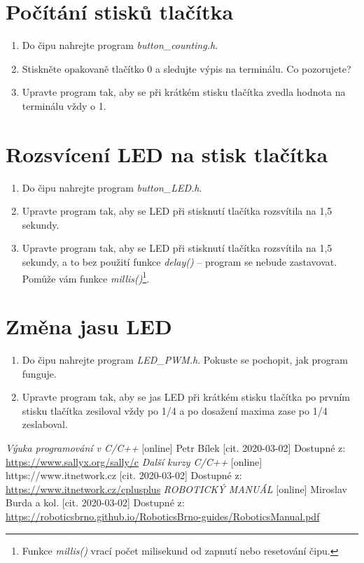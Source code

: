 \documentclass[12pt]{article}
\begin{document}
\section{Počítání stisků tlačítka} 

\begin{enumerate} 
	\item Do čipu nahrejte program \textit{button\_counting.h}. 
	\item Stiskněte opakovaně tlačítko 0 a sledujte výpis na terminálu. Co pozorujete? 
	\item Upravte program tak, aby se při krátkém stisku tlačítka zvedla hodnota na terminálu vždy o 1.
\end{enumerate} 

\section{Rozsvícení LED na stisk tlačítka} \label{button_LED}

\begin{enumerate}
	\item Do čipu nahrejte program \textit{button\_LED.h}.
	\item Upravte program tak, aby se LED při stisknutí tlačítka rozsvítila na 1,5 sekundy. \label{button_LED2}
	\item Upravte program tak, aby se LED při stisknutí tlačítka rozsvítila na 1,5 sekundy, a to bez použití funkce \textit{delay()} -- program se nebude zastavovat. Pomůže vám funkce \textit{millis()}\footnote{Funkce \textit{millis()} vrací počet milisekund od zapnutí nebo resetování čipu.}.
	\label{button_LED3}
\end{enumerate}

\section{Změna jasu LED}

\begin{enumerate}
	\item Do čipu nahrejte program \textit{LED\_PWM.h}. Pokuste se pochopit, jak program funguje.
	\item Upravte program tak, aby se jas LED při krátkém stisku tlačítka po prvním stisku tlačítka zesiloval vždy po 1/4 a po dosažení maxima zase po 1/4 zeslaboval. 
	
\end{enumerate}

\renewcommand{\refname}{Další zdroje}
\begin{thebibliography}{1}
	\textit{Výuka programování v C/C++} [online] Petr Bílek  [cit. 2020-03-02] Dostupné z:  
	\url{https://www.sallyx.org/sally/c}
	\textit{Další kurzy C/C++} [online] https://www.itnetwork.cz [cit. 2020-03-02] Dostupné z:  \url{https://www.itnetwork.cz/cplusplus}
	\textit{ROBOTICKÝ MANUÁL} [online] Miroslav Burda a kol. [cit. 2020-03-02] 
	Dostupné z:  \url{https://roboticsbrno.github.io/RoboticsBrno-guides/RoboticsManual.pdf}		
\end{thebibliography}
\end{document}
